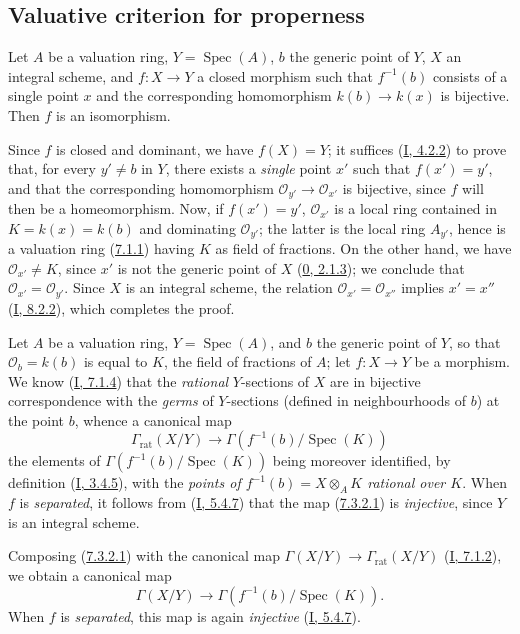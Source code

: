\subsection{Valuative criterion for properness}
\label{subsection:II.7.3}

\begin{proposition}[7.3.1]
\label{II.7.3.1}
Let $A$ be a valuation ring, $Y=\operatorname{Spec}(A)$, $b$ the generic
point of $Y$, $X$ an integral scheme, and $f:X\to Y$ a closed morphism such
that $f^{-1}(b)$ consists of a single point $x$ and the corresponding
homomorphism $k(b)\to k(x)$ is bijective. Then $f$ is an isomorphism.
\end{proposition}

Since $f$ is closed and dominant, we have $f(X)=Y$; it suffices
(\hyperref[I.4.2.2]{I, 4.2.2}) to prove that, for every $y'\neq b$ in $Y$,
there exists a \emph{single} point $x'$ such that $f(x')=y'$, and that the
corresponding homomorphism $\mathcal{O}_{y'}\to\mathcal{O}_{x'}$ is bijective,
since $f$ will then be a homeomorphism. Now, if $f(x')=y'$, $\mathcal{O}_{x'}$
is a local ring contained in $K=k(x)=k(b)$ and dominating $\mathcal{O}_{y'}$;
the latter is the local ring $A_{y'}$, hence is a valuation ring
(\hyperref[II.7.1.1]{7.1.1}) having $K$ as field of fractions. On the
other hand, we have $\mathcal{O}_{x'}\neq K$, since $x'$ is not the generic
point of $X$ (\hyperref[0.2.1.3]{0, 2.1.3}); we conclude that
$\mathcal{O}_{x'}=\mathcal{O}_{y'}$. Since $X$ is an integral scheme, the
relation $\mathcal{O}_{x'}=\mathcal{O}_{x''}$ implies $x'=x''$
(\hyperref[I.8.2.2]{I, 8.2.2}), which completes the proof.

\begin{env}[7.3.2]
\label{II.7.3.2}
Let $A$ be a valuation ring, $Y=\operatorname{Spec}(A)$, and $b$ the generic
point of $Y$, so that $\mathcal{O}_b=k(b)$ is equal to $K$, the field of
fractions of $A$; let $f:X\to Y$ be a morphism. We know
(\hyperref[I.7.1.4]{I, 7.1.4}) that the \emph{rational} $Y$-sections of
$X$ are in bijective correspondence with the \emph{germs} of $Y$-sections
(defined in neighbourhoods of $b$) at the point $b$, whence a canonical
map
\[
\tag{7.3.2.1}
\label{II.7.3.2.1}
\Gamma_{\mathrm{rat}}(X/Y)\longrightarrow
\Gamma(f^{-1}(b)/\operatorname{Spec}(K))
\]
the elements of $\Gamma(f^{-1}(b)/\operatorname{Spec}(K))$ being moreover
identified, by definition (\hyperref[I.3.4.5]{I, 3.4.5}), with the
\emph{points of $f^{-1}(b)=X\otimes_AK$ rational over $K$}. When $f$ is
\emph{separated}, it follows from (\hyperref[I.5.4.7]{I, 5.4.7}) that the
map (\hyperref[II.7.3.2.1]{7.3.2.1}) is \emph{injective}, since $Y$ is
an integral scheme.

Composing (\hyperref[II.7.3.2.1]{7.3.2.1}) with the canonical map
$\Gamma(X/Y)\to\Gamma_{\mathrm{rat}}(X/Y)$
(\hyperref[I.7.1.2]{I, 7.1.2}), we obtain a canonical map
\[
\tag{7.3.2.2}
\label{II.7.3.2.2}
\Gamma(X/Y)\longrightarrow \Gamma(f^{-1}(b)/\operatorname{Spec}(K)).
\]
When $f$ is \emph{separated}, this map is again \emph{injective}
(\hyperref[I.5.4.7]{I, 5.4.7}).
\end{env}

